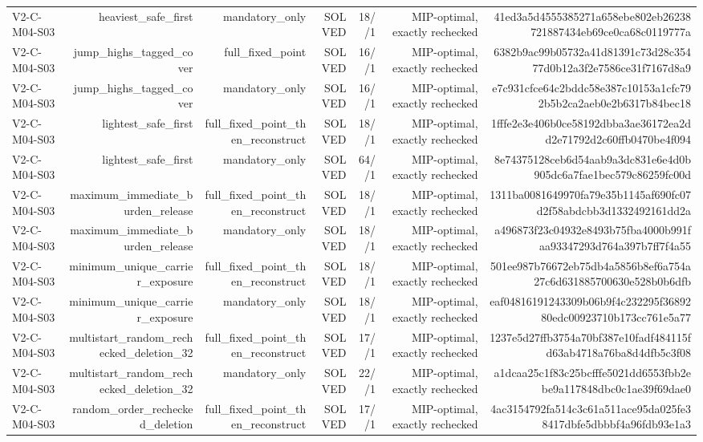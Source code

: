 {\begin{longtable}{lrrrrrr}
V2-C-M04-S03 & heaviest\_safe\_first & mandatory\_only & SOLVED & 18//1 & MIP-optimal, exactly rechecked & 41ed3a5d4555385271a658ebe802eb26238721887434eb69ce0ca68c0119777a \\
V2-C-M04-S03 & jump\_highs\_tagged\_cover & full\_fixed\_point & SOLVED & 16//1 & MIP-optimal, exactly rechecked & 6382b9ac99b05732a41d81391c73d28c35477d0b12a3f2e7586ce31f7167d8a9 \\
V2-C-M04-S03 & jump\_highs\_tagged\_cover & mandatory\_only & SOLVED & 16//1 & MIP-optimal, exactly rechecked & e7c931cfce64c2bddc58e387c10153a1cfc792b5b2ca2aeb0e2b6317b84bec18 \\
V2-C-M04-S03 & lightest\_safe\_first & full\_fixed\_point\_then\_reconstruct & SOLVED & 18//1 & MIP-optimal, exactly rechecked & 1fffe2e3e406b0ce58192dbba3ae36172ea2dd2e71792d2c60ffb0470be4f094 \\
V2-C-M04-S03 & lightest\_safe\_first & mandatory\_only & SOLVED & 64//1 & MIP-optimal, exactly rechecked & 8e74375128ceb6d54aab9a3dc831e6e4d0b905dc6a7fae1bec579c86259fc00d \\
V2-C-M04-S03 & maximum\_immediate\_burden\_release & full\_fixed\_point\_then\_reconstruct & SOLVED & 18//1 & MIP-optimal, exactly rechecked & 1311ba0081649970fa79e35b1145af690fc07d2f58abdcbb3d1332492161dd2a \\
V2-C-M04-S03 & maximum\_immediate\_burden\_release & mandatory\_only & SOLVED & 18//1 & MIP-optimal, exactly rechecked & a496873f23c04932e8493b75fba4000b991faa93347293d764a397b7ff7f4a55 \\
V2-C-M04-S03 & minimum\_unique\_carrier\_exposure & full\_fixed\_point\_then\_reconstruct & SOLVED & 18//1 & MIP-optimal, exactly rechecked & 501ee987b76672eb75db4a5856b8ef6a754a27c6d631885700630e528b0b6dfb \\
V2-C-M04-S03 & minimum\_unique\_carrier\_exposure & mandatory\_only & SOLVED & 18//1 & MIP-optimal, exactly rechecked & eaf04816191243309b06b9f4c232295f3689280edc00923710b173cc761e5a77 \\
V2-C-M04-S03 & multistart\_random\_rechecked\_deletion\_32 & full\_fixed\_point\_then\_reconstruct & SOLVED & 17//1 & MIP-optimal, exactly rechecked & 1237e5d27ffb3754a70bf387e10fadf484115fd63ab4718a76ba8d4dfb5c3f08 \\
V2-C-M04-S03 & multistart\_random\_rechecked\_deletion\_32 & mandatory\_only & SOLVED & 22//1 & MIP-optimal, exactly rechecked & a1dcaa25c1f83c25bcfffe5021dd6553fbb2ebe9a117848dbc0c1ae39f69dae0 \\
V2-C-M04-S03 & random\_order\_rechecked\_deletion & full\_fixed\_point\_then\_reconstruct & SOLVED & 17//1 & MIP-optimal, exactly rechecked & 4ac3154792fa514c3c61a511ace95da025fe38417dbfe5dbbbf4a96fdb93e1a3 \\

\end{longtable}}
